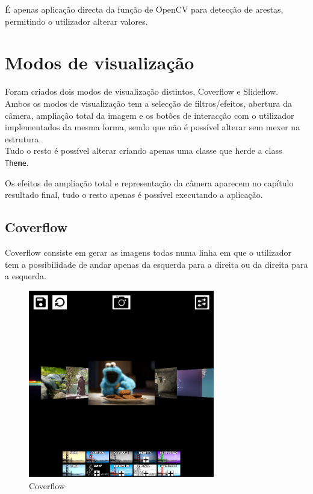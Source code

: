 \documentclass[portugues,final]{revdetua}
\begin{document}
É apenas aplicação directa da função de OpenCV para detecção de arestas, permitindo o utilizador alterar valores.

\section{Modos de visualização}

Foram criados dois modos de visualização distintos, Coverflow e Slideflow.\\

Ambos os modos de visualização tem a selecção de filtros/efeitos, abertura da câmera, ampliação total da imagem e os botões de interacção com o utilizador implementados da mesma forma, sendo que não é possível alterar sem mexer na estrutura.\\

Tudo o resto é possível alterar criando apenas uma classe que herde a class {\tt Theme}.

Os efeitos de ampliação total e representação da câmera aparecem no capítulo resultado final, tudo o resto apenas é possível executando a aplicação.
\break

\subsection{Coverflow}

Coverflow consiste em gerar as imagens todas numa linha em que o utilizador tem a possibilidade de andar apenas da esquerda para a direita ou da direita para a esquerda.

\begin{figure}[H]
\centerline{\includegraphics[width=230pt]{images/coverflow.png}}
\caption{Coverflow}
\label{img:complete}
\end{figure}
\end{document}
